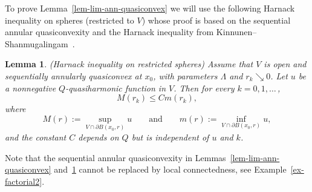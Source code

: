 \documentclass[a4paper,twoside]{article}
\theoremstyle{propositional}
\newtheorem{lem}[thm]{Lemma}
\theoremstyle{descriptive}
\theoremstyle{remarkstyle}
\newcommand{\bdry}{\partial}
\newcommand{\bdy}{\bdry}
\newcommand{\La}{\Lambda}
\numberwithin{equation}{section}
\begin{document}
To prove Lemma~\ref{lem-lim-ann-quasiconvex} we will
use the following Harnack inequality on spheres
(restricted to $V$)
whose proof is based on the sequential annular quasiconvexity and
the Harnack inequality from
Kinnunen--Shan\-mu\-ga\-lin\-gam~\cite{KiSh01}.



\begin{lem} \label{lem-Harnack-on-spheres}
\textup{(Harnack inequality on restricted spheres)}
Assume that $V$ is open and
sequentially annularly quasiconvex at $x_0$, 
with parameters $\La$ and $r_k \searrow 0$.
Let  $u$ be a nonnegative $Q$-quasiharmonic function in $V$.
Then for every $k=0,1,\dots$\,,
\begin{equation*} %
M(r_k) \le C m(r_k),
\end{equation*}
where 
\begin{equation}   \label{eq-def-m-M}
M(r):= \sup_{V \cap \bdy B(x_0,r)} u
\qquad \text{and} \qquad %
m(r) := \inf_{V \cap\bdy B(x_0,r)} u,
\end{equation}
and the constant $C$ depends on $Q$
but is independent of $u$ and $k$.
\end{lem}
        

Note that  the sequential
annular quasiconvexity in 
Lemmas~\ref{lem-lim-ann-quasiconvex} and~\ref{lem-Harnack-on-spheres}
cannot be replaced by local connectedness,
see Example~\ref{ex-factorial2}.
\end{document}
